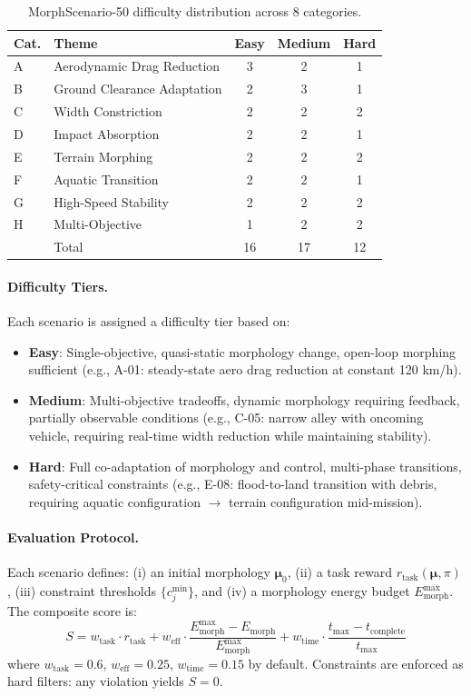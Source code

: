 \begin{table}[h]
\centering
\small
\begin{tabular}{@{}llccc@{}}
\toprule
Cat. & Theme & Easy & Medium & Hard \\
\midrule
A & Aerodynamic Drag Reduction & 3 & 2 & 1 \\
B & Ground Clearance Adaptation & 2 & 3 & 1 \\
C & Width Constriction & 2 & 2 & 2 \\
D & Impact Absorption & 2 & 2 & 1 \\
E & Terrain Morphing & 2 & 2 & 2 \\
F & Aquatic Transition & 2 & 2 & 1 \\
G & High-Speed Stability & 2 & 2 & 2 \\
H & Multi-Objective & 1 & 2 & 2 \\
\midrule
 & Total & 16 & 17 & 12 \\
\bottomrule
\end{tabular}
\caption{MorphScenario-50 difficulty distribution across 8 categories.}
\label{tab:scenarios}
\end{table}

\paragraph{Difficulty Tiers.}
Each scenario is assigned a difficulty tier based on:
\begin{itemize}
    \item \textbf{Easy}: Single-objective, quasi-static morphology change, open-loop morphing sufficient (e.g., A-01: steady-state aero drag reduction at constant 120 km/h).
    \item \textbf{Medium}: Multi-objective tradeoffs, dynamic morphology requiring feedback, partially observable conditions (e.g., C-05: narrow alley with oncoming vehicle, requiring real-time width reduction while maintaining stability).
    \item \textbf{Hard}: Full co-adaptation of morphology and control, multi-phase transitions, safety-critical constraints (e.g., E-08: flood-to-land transition with debris, requiring aquatic configuration $\to$ terrain configuration mid-mission).
\end{itemize}

\paragraph{Evaluation Protocol.}
Each scenario defines: (i) an initial morphology $\boldsymbol{\mu}_0$, (ii) a task reward $r_\text{task}(\boldsymbol{\mu}, \pi)$, (iii) constraint thresholds $\{c_j^{\min}\}$, and (iv) a morphology energy budget $E_\text{morph}^{\max}$. The composite score is:
\begin{equation}
    S = w_\text{task} \cdot r_\text{task} + w_\text{eff} \cdot \frac{E_\text{morph}^{\max} - E_\text{morph}}{E_\text{morph}^{\max}} + w_\text{time} \cdot \frac{t_\text{max} - t_\text{complete}}{t_\text{max}}
    \label{eq:score}
\end{equation}
where $w_\text{task} = 0.6$, $w_\text{eff} = 0.25$, $w_\text{time} = 0.15$ by default. Constraints are enforced as hard filters: any violation yields $S = 0$.

